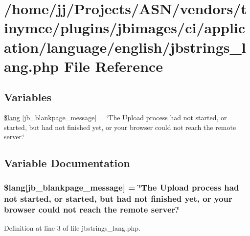 \hypertarget{english_2jbstrings__lang_8php}{}\section{/home/jj/\+Projects/\+A\+S\+N/vendors/tinymce/plugins/jbimages/ci/application/language/english/jbstrings\+\_\+lang.php File Reference}
\label{english_2jbstrings__lang_8php}
\subsection*{Variables}
\begin{DoxyCompactItemize}
\item 
\hyperlink{english_2jbstrings__lang_8php_a940d854d6735a1c346b18d7692b81d72}{\$lang} \mbox{[}\textquotesingle{}jb\+\_\+blankpage\+\_\+message\textquotesingle{}\mbox{]} = \char`\"{}The Upload process had not started, or started, but had not finished yet, or your browser could not reach the remote server.\char`\"{}
\end{DoxyCompactItemize}


\subsection{Variable Documentation}
\subsubsection[{\texorpdfstring{\$lang}{$lang}}]{\setlength{\rightskip}{0pt plus 5cm}\$lang\mbox{[}\textquotesingle{}jb\+\_\+blankpage\+\_\+message\textquotesingle{}\mbox{]} = \char`\"{}The Upload process had not started, or started, but had not finished yet, or your browser could not reach the remote server.\char`\"{}}\hypertarget{english_2jbstrings__lang_8php_a940d854d6735a1c346b18d7692b81d72}{}\label{english_2jbstrings__lang_8php_a940d854d6735a1c346b18d7692b81d72}


Definition at line 3 of file jbstrings\+\_\+lang.\+php.

